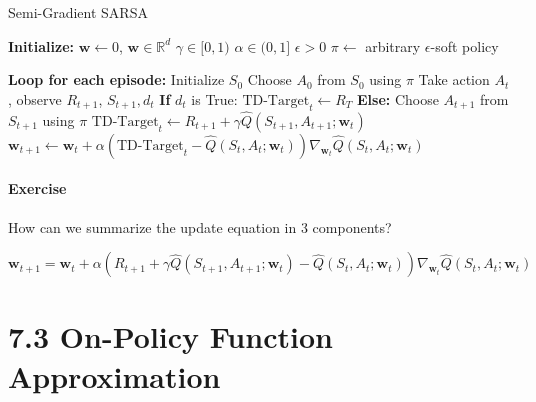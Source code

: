 \documentclass[
  letterpaper,
  DIV=11,
  numbers=noendperiod]{scrreprt}
\begin{document}
\begin{algorithm}[htb!]
\caption{Semi-Gradient SARSA}
\begin{algorithmic}[1]
\State \textbf{Initialize:}
\State $\mathbf{w} \gets 0$, $\mathbf{w} \in \mathbb{R}^{d}$
\State $\gamma \in [0,1)$
\State $\alpha \in (0,1]$ 
\State $\epsilon > 0$ 
\State $\pi \gets$ arbitrary $\epsilon$-soft policy 

\State \textbf{Loop for each episode:}
\State Initialize $S_{0}$
\State Choose $A_{0}$ from $S_{0}$ using $\pi$ 
\Repeat
  \State Take action $A_{t}$, observe $R_{t+1}$, $S_{t+1}, d_{t}$
  \State \textbf{If} $d_{t}$ is True:
  \State \quad $\text{TD-Target}_{t} \gets R_{T}$
  \State \textbf{Else:}
  \State \quad Choose $A_{t+1}$ from $S_{t+1}$ using $\pi$
  \State \quad $\text{TD-Target}_{t} \gets R_{t+1} + \gamma \hat{Q}(S_{t+1}, A_{t+1}; \mathbf{w}_{t})$
  \State $\mathbf{w}_{t+1} \gets \mathbf{w}_{t} + \alpha(\text{TD-Target}_{t} - \hat{Q}(S_{t},A_{t}; \mathbf{w}_{t}))\nabla_{\mathbf{w}_{t}} \hat{Q}(S_{t},A_{t}; \mathbf{w}_{t})$

\end{algorithmic}
\end{algorithm}

\subsubsection{Exercise}\label{exercise-12}

How can we summarize the update equation in 3 components?

\[
\mathbf{w}_{t+1} = \mathbf{w}_{t} + \alpha(R_{t+1} + \gamma \hat{Q}(S_{t+1},A_{t+1}; \mathbf{w}_{t}) - \hat{Q}(S_{t},A_{t}; \mathbf{w}_{t}))\nabla_{\mathbf{w}_{t}} \hat{Q}(S_{t},A_{t}; \mathbf{w}_{t})
\]

\begin{tcolorbox}[enhanced jigsaw, toprule=.15mm, leftrule=.75mm, coltitle=black, left=2mm, opacityback=0, titlerule=0mm, arc=.35mm, toptitle=1mm, opacitybacktitle=0.6, bottomtitle=1mm, colframe=quarto-callout-tip-color-frame, title=\textcolor{quarto-callout-tip-color}{\faLightbulb}\hspace{0.5em}{Solution}, rightrule=.15mm, bottomrule=.15mm, colbacktitle=quarto-callout-tip-color!10!white, breakable, colback=white]

\end{tcolorbox}

\chapter{7.3 On-Policy Function
Approximation}\label{on-policy-function-approximation-2}
\end{document}
